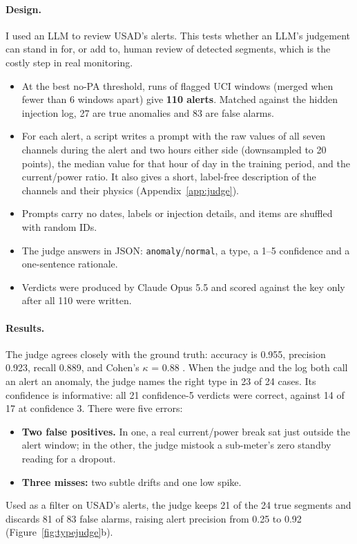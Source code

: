 \documentclass[11pt]{article}
\begin{document}
\paragraph{Design.} I used an LLM to review USAD's alerts. This tests whether an LLM's judgement can stand in for, or add to, human review of detected segments, which is the costly step in real monitoring.
\begin{itemize}
\item At the best no-PA threshold, runs of flagged UCI windows (merged when fewer than 6 windows apart) give \textbf{110 alerts}. Matched against the hidden injection log, 27 are true anomalies and 83 are false alarms.
\item For each alert, a script writes a prompt with the raw values of all seven channels during the alert and two hours either side (downsampled to 20 points), the median value for that hour of day in the training period, and the current/power ratio. It also gives a short, label-free description of the channels and their physics (Appendix~\ref{app:judge}).
\item Prompts carry no dates, labels or injection details, and items are shuffled with random IDs.
\item The judge answers in JSON: \texttt{anomaly}/\texttt{normal}, a type, a 1--5 confidence and a one-sentence rationale.
\item Verdicts were produced by Claude Opus 5.5 and scored against the key only after all 110 were written.
\end{itemize}

\paragraph{Results.} The judge agrees closely with the ground truth: accuracy is 0.955, precision 0.923, recall 0.889, and Cohen's $\kappa$ = 0.88 \citep{cohen1960}. When the judge and the log both call an alert an anomaly, the judge names the right type in 23 of 24 cases. Its confidence is informative: all 21 confidence-5 verdicts were correct, against 14 of 17 at confidence 3. There were five errors:
\begin{itemize}
\item \textbf{Two false positives.} In one, a real current/power break sat just outside the alert window; in the other, the judge mistook a sub-meter's zero standby reading for a dropout.
\item \textbf{Three misses:} two subtle drifts and one low spike.
\end{itemize}
Used as a filter on USAD's alerts, the judge keeps 21 of the 24 true segments and discards 81 of 83 false alarms, raising alert precision from 0.25 to 0.92 (Figure~\ref{fig:typejudge}b).
\end{document}
